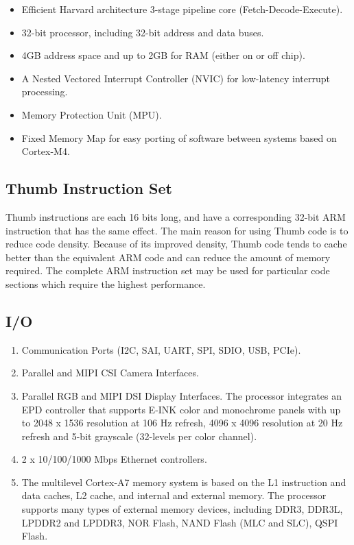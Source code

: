 \documentclass{article}
\begin{document}
\begin{itemize}
    \item Efficient Harvard architecture 3-stage pipeline core (Fetch-Decode-Execute). 
    \item 32-bit processor, including 32-bit address and data buses.
    \item 4GB address space and up to 2GB for RAM (either on or off chip).
    \item A Nested Vectored Interrupt Controller (NVIC) for low-latency interrupt processing.
    \item Memory Protection Unit (MPU).
    \item Fixed Memory Map for easy porting of software between systems based on Cortex-M4.
  \end{itemize}

\vspace*{2mm}

\subsection*{Thumb Instruction Set} \label{subsection:Thumb}

Thumb instructions are each 16 bits long, and have a corresponding 32-bit ARM instruction that has the same effect. The main reason for using Thumb code is to reduce code density. Because of its
improved density, Thumb code tends to cache better than the equivalent ARM code and can
reduce the amount of memory required. The complete ARM instruction set may be used for particular code sections which require the highest performance.\\

\subsection{I/O} \label{subsection:I/O}

\begin{enumerate}
    \item Communication Ports (I2C, SAI, UART, SPI, SDIO, USB, PCIe).
    \item Parallel and MIPI CSI Camera Interfaces.
    \item Parallel RGB and MIPI DSI Display Interfaces. The processor integrates an EPD controller that supports E-INK color and monochrome panels with up to 2048 x 1536 resolution at 106 Hz refresh, 4096 x 4096 resolution at 20 Hz refresh and 5-bit grayscale (32-levels per color channel).
    \item 2 x 10/100/1000 Mbps Ethernet controllers.
    \item The multilevel Cortex-A7 memory system is based on the L1 instruction and data caches, L2 cache, and internal and external memory. The processor supports many types of external memory devices, including DDR3, DDR3L, LPDDR2 and LPDDR3, NOR Flash, NAND Flash (MLC and SLC), QSPI Flash.
  \end{enumerate}
\end{document}
